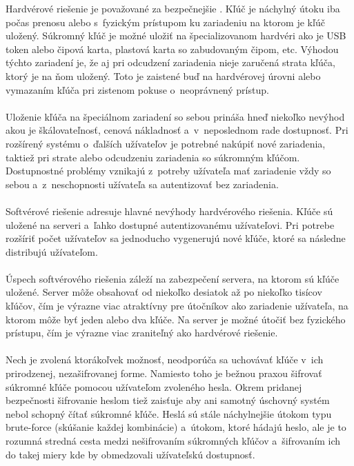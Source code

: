 \documentclass[
  digital, %
  table,   %
oneside,
  nolof,     %
  nolot,     %
]{fithesis3}
\begin{document}
Hardvérové riešenie je považované za bezpečnejšie \cite{privateKeyStorage}. Kľúč je náchylný útoku iba počas prenosu alebo s~fyzickým prístupom ku zariadeniu na ktorom je kľúč uložený. Súkromný kľúč je možné uložiť na špecializovanom hardvéri ako je USB token alebo  čipová karta, plastová karta so zabudovaným čipom, etc. Výhodou týchto zariadení je, že aj pri odcudzení zariadenia nieje zaručená strata kľúča, ktorý je na ňom uložený. Toto je zaistené buď na hardvérovej úrovni alebo vymazaním kľúča pri zistenom pokuse o~neoprávnený prístup.\paragraph{}
Uloženie kľúča na špeciálnom zariadení so sebou prináša hneď niekoľko nevýhod akou je škálovateľnosť, cenová nákladnosť a~v~neposlednom rade dostupnosť. Pri rozšírený systému o~ďalších užívateľov je potrebné nakúpiť nové zariadenia, taktiež pri strate alebo odcudzeniu zariadenia so súkromným kľúčom. Dostupnostné problémy vznikajú z~potreby užívateľa mať zariadenie vždy so sebou a~z~neschopnosti užívateľa sa autentizovať bez zariadenia. \paragraph{} 
Softvérové riešenie adresuje hlavné nevýhody hardvérového riešenia. Kľúče sú uložené na serveri a~ľahko dostupné autentizovanému užívateľovi. Pri potrebe rozšíriť počet užívateľov sa jednoducho vygenerujú nové kľúče, ktoré sa následne distribujú užívateľom.  \paragraph{}
Úspech softvérového riešenia záleží na zabezpečení servera, na ktorom sú kľúče uložené. Server môže obsahovať od niekoľko desiatok až po niekoľko tisícov kľúčov, čím je výrazne viac atraktívny pre útočníkov ako zariadenie užívateľa, na ktorom môže byť jeden alebo dva kľúče. Na server je možné útočiť bez fyzického prístupu, čím je výrazne viac zraniteľný ako hardvérové riešenie. \paragraph{}

Nech je zvolená ktorákoľvek možnosť, neodporúča sa  uchovávať kľúče v~ich prirodzenej, nezašifrovanej forme. Namiesto toho je bežnou praxou šifrovať súkromné kľúče pomocou užívateľom zvoleného hesla. Okrem pridanej bezpečnosti šifrovanie heslom tiež zaisťuje aby ani samotný úschovný systém nebol schopný čítať súkromné kľúče. Heslá sú stále náchylnejšie útokom typu brute-force (skúšanie každej kombinácie) a~útokom, ktoré hádajú heslo, ale je to rozumná stredná cesta medzi nešifrovaním súkromných kľúčov a~šifrovaním ich do takej miery kde by obmedzovali užívateľskú dostupnosť. \paragraph{}   
 
\end{document}
